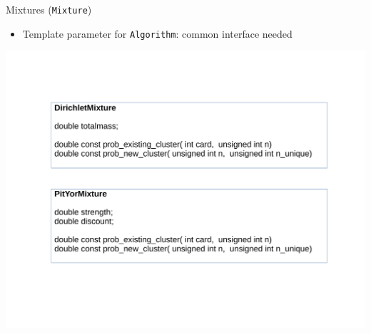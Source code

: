 \begin{frame}{Mixtures (\texttt{Mixture})}
\begin{itemize}
	\item Template parameter for \texttt{Algorithm}: common interface needed
\end{itemize}

\begin{center}
	\includegraphics[scale=0.35]{etc/mixture.pdf}
\end{center}

\end{frame}
